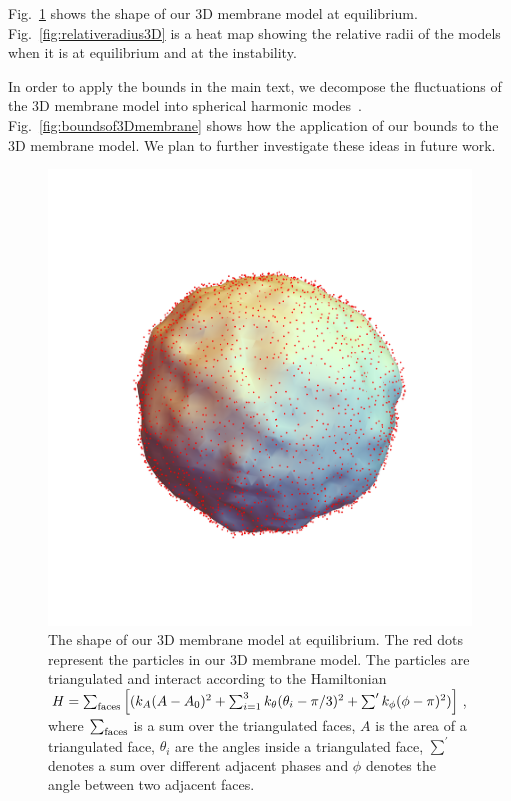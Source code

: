 \documentclass[amsmath,preprintnumbers,10pt,nofootinbib,prl,twocolumn]{revtex4-1}
\begin{document}
Fig.~\ref{fig:3Dmembranesurface} shows the shape of our 3D membrane model at equilibrium. Fig.~\ref{fig:relativeradius3D} is a heat map showing the relative radii of the models when it is at equilibrium and at the instability.

In order to apply the bounds in the main text, we decompose the fluctuations of the 3D membrane model into spherical harmonic modes~\cite{Safran1987}. Fig.~\ref{fig:boundsof3Dmembrane} shows how the application of our bounds to the 3D membrane model. We plan to further investigate these ideas in future work. 

\begin{figure}
\includegraphics[width=1\linewidth,angle=0]{Fig10.pdf}
\caption{ The shape of our 3D membrane model at equilibrium. The red dots represent the particles in our 3D membrane model. The particles are triangulated and interact according to the Hamiltonian $H=\sum_{\rm faces}\left[ (k_A(A-A_0)^2 +\sum_{i=1}^3 k_\theta (\theta_i-\pi/3)^2 + \sum^\prime k_\phi (\phi-\pi)^2)\right]$, where $\sum_{\rm faces}$ is a sum over the triangulated faces, $A$ is the area of a triangulated face, $\theta_i$ are the angles inside a triangulated face,  $\sum^\prime$ denotes a sum over different adjacent phases and $\phi$ denotes the angle between two adjacent faces.}
\label{fig:3Dmembranesurface}
\end{figure}
\end{document}
